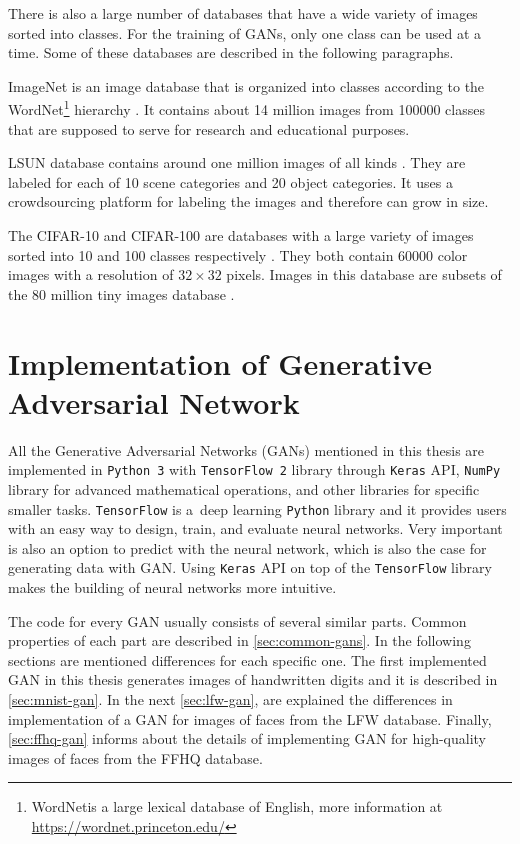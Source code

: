 There is also a large number of databases that have a wide variety of images sorted into classes. For the training of GANs, only one class can be used at a time. Some of these databases are described in the following paragraphs.

ImageNet is an image database that is organized into classes according to the WordNet\footnote{WordNet\textregistered is a large lexical database of English, more information at \url{https://wordnet.princeton.edu/}} hierarchy \cite{imagenet_cvpr09}. It contains about 14 million images from 100000 classes that are supposed to serve for research and educational purposes.

LSUN database contains around one million images of all kinds \cite{yu2015lsun}. They are labeled for each of 10 scene categories and 20 object categories. It uses a crowdsourcing platform for labeling the images and therefore can grow in size.

The CIFAR-10 and CIFAR-100 are databases with a large variety of images sorted into 10 and 100 classes respectively \cite{cifar}. They both contain 60000 color images with a resolution of $32 \times 32$ pixels. Images in this database are subsets of the 80 million tiny images database \cite{tinyimages}.

\chapter{\label{chap:implementation}Implementation of Generative Adversarial Network}
All the Generative Adversarial Networks (GANs) mentioned in this thesis are implemented in \texttt{Python 3} with \texttt{TensorFlow 2} library through \texttt{Keras} API, \texttt{NumPy} library for advanced mathematical operations, and other libraries for specific smaller tasks. \texttt{TensorFlow} is a~deep learning \texttt{Python} library and it provides users with an easy way to design, train, and evaluate neural networks. Very important is also an option to predict with the neural network, which is also the case for generating data with GAN. Using \texttt{Keras} API on top of the \texttt{TensorFlow} library makes the building of neural networks more intuitive.

The code for every GAN usually consists of several similar parts. Common properties of each part are described in \autoref{sec:common-gans}. In the following sections are mentioned differences for each specific one. The first implemented GAN in this thesis generates images of handwritten digits and it is described in \autoref{sec:mnist-gan}. In the next \autoref{sec:lfw-gan}, are explained the differences in implementation of a GAN for images of faces from the LFW database. Finally, \autoref{sec:ffhq-gan} informs about the details of implementing GAN for high-quality images of faces from the FFHQ database.

